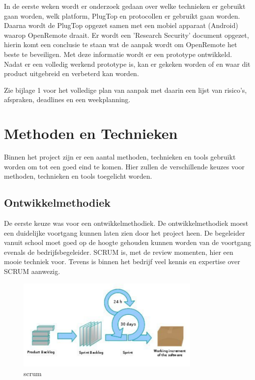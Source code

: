 \documentclass[]{article}
\begin{document}
In de eerste weken wordt  er  onderzoek  gedaan  over  welke  technieken  er
gebruikt gaan worden, welk platform,  PlugTop  en  protocollen  er  gebruikt
gaan worden. Daarna wordt de PlugTop opgezet samen met een  mobiel  apparaat
(Android)  waarop  OpenRemote  draait.  Er  wordt  een  'Research  Security'
document opgezet, hierin komt een conclusie te staan wat de aanpak wordt  om
OpenRemote het beste  te  beveiligen.  Met  deze  informatie  wordt  er  een
prototype ontwikkeld. Nadat er een volledig werkend  prototype  is,  kan  er
gekeken worden of en waar dit product uitgebreid en verbeterd kan worden.

Zie bijlage 1 voor het volledige plan van aanpak met daarin een lijst  van
risico's,  afspraken,  deadlines  en  een weekplanning.

\newpage
\section{Methoden en Technieken}

Binnen het project zijn er een aantal methoden, technieken en tools
gebruikt worden om tot een goed eind te komen. Hier zullen de
verschillende keuzes voor methoden, technieken en tools toegelicht worden.

\subsection{Ontwikkelmethodiek}
De eerste keuze was voor een ontwikkelmethodiek. De ontwikkelmethodiek
moest een duidelijke voortgang kunnen laten zien door het project heen. De
begeleider vanuit school moet goed op de hoogte gehouden kunnen worden van
de voortgang evenals de bedrijfsbegeleider. SCRUM is, met de review
momenten, hier een mooie techniek voor. Tevens is binnen het bedrijf veel
kennis en expertise over SCRUM aanwezig.

\begin{figure}[htpb]
  \begin{center}
    \includegraphics[width=0.80\textwidth]{scrum.pdf}
  \end{center}
  \caption{scrum}
\end{figure}
\end{document}
